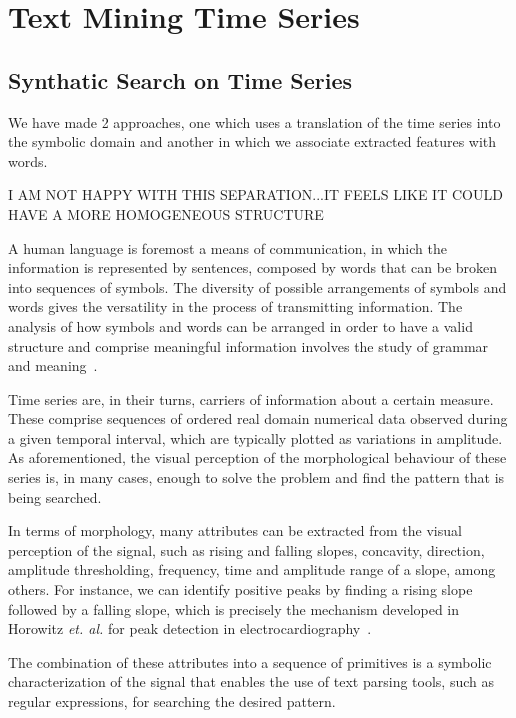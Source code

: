 
%

\chapter{Text Mining Time Series}
\label{cha:text_}



\section{Synthatic Search on Time Series}

We have made 2 approaches, one which uses a translation of the time series into the symbolic domain and another in which we associate extracted features with words.


I AM NOT HAPPY WITH THIS SEPARATION...IT FEELS LIKE IT COULD HAVE A MORE HOMOGENEOUS STRUCTURE

A human language is foremost a means of communication, in which the information is represented by sentences, composed by words that can be broken into sequences of symbols. The diversity of possible arrangements of symbols and words gives the versatility in the process of transmitting information. The analysis of how symbols and words can be arranged in order to have a valid structure and comprise meaningful information involves the study of grammar and meaning~\citep{davidCrystal}.
\par
Time series are, in their turns, carriers of information about a certain measure. These comprise sequences of ordered real domain numerical data observed during a given temporal interval, which are typically plotted as variations in amplitude. As aforementioned, the visual perception of the morphological behaviour of these series is, in many cases, enough to solve the problem and find the pattern that is being searched.
\par
In terms of morphology, many attributes can be extracted from the visual perception of the signal, such as rising and falling slopes, concavity, direction, amplitude thresholding, frequency, time and amplitude range of a slope, among others. For instance, we can identify positive peaks by finding a rising slope followed by a falling slope, which is precisely the mechanism developed in Horowitz \textit{et. al.} for peak detection in electrocardiography~\citep{Horowitz}.
\par
The combination of these attributes into a sequence of primitives is a symbolic characterization of the signal that enables the use of text parsing tools, such as regular expressions, for searching the desired pattern.


